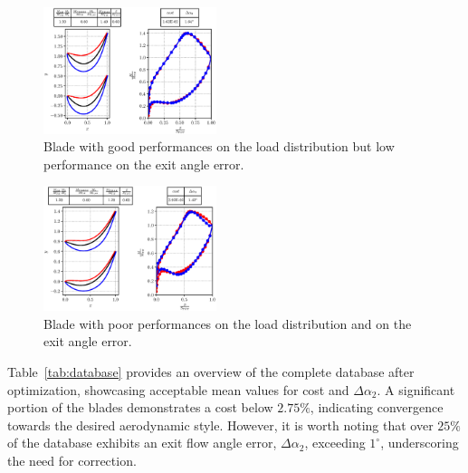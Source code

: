 \documentclass[11pt,a4paper,twocolumn]{article}
\begin{document}
\begin{figure}[!h]
    \centering 
    \hspace*{-0.6cm}
    \includegraphics[width=0.45\textwidth]{./images/bladeVal0477.eps}
    \caption{Blade with good performances on the load distribution but low performance on the exit angle error.}
    \label{fig:midBlade}
\end{figure}

\begin{figure}[!h]
    \centering
    \hspace*{-0.6cm}
    \includegraphics[width=0.45\textwidth]{./images/bladeVal1962.eps}
    \caption{Blade with poor performances on the load distribution and on the exit angle error.}
    \label{fig:badBlade}
\end{figure}


Table~\ref{tab:database} provides an overview of the complete database after optimization, showcasing acceptable mean values for cost and $\Delta \alpha_2$. A significant portion of the blades demonstrates a cost below $2.75\%$, indicating convergence towards the desired aerodynamic style. However, it is worth noting that over $25\%$ of the database exhibits an exit flow angle error, $\Delta \alpha_2$, exceeding $1^{\circ}$, underscoring the need for correction.
\end{document}
